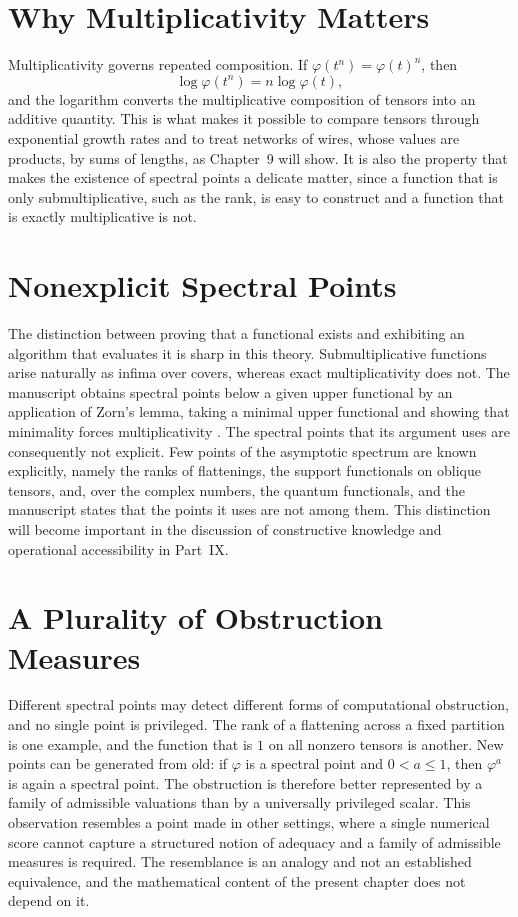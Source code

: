\documentclass[11pt,letterpaper]{report}
\theoremstyle{plain}
\theoremstyle{definition}
\theoremstyle{remark}
\begin{document}
\section{Why Multiplicativity Matters}

Multiplicativity governs repeated composition. If $\varphi(t^{n})=\varphi(t)^n$, then
\[
\log\varphi(t^{n})=n\log\varphi(t),
\]
and the logarithm converts the multiplicative composition of tensors into an additive quantity. This is what makes it possible to compare tensors through exponential growth rates and to treat networks of wires, whose values are products, by sums of lengths, as Chapter~9 will show. It is also the property that makes the existence of spectral points a delicate matter, since a function that is only submultiplicative, such as the rank, is easy to construct and a function that is exactly multiplicative is not.

\section{Nonexplicit Spectral Points}

The distinction between proving that a functional exists and exhibiting an algorithm that evaluates it is sharp in this theory. Submultiplicative functions arise naturally as infima over covers, whereas exact multiplicativity does not. The manuscript obtains spectral points below a given upper functional by an application of Zorn's lemma, taking a minimal upper functional and showing that minimality forces multiplicativity \cite{Source2026}. The spectral points that its argument uses are consequently not explicit. Few points of the asymptotic spectrum are known explicitly, namely the ranks of flattenings, the support functionals on oblique tensors, and, over the complex numbers, the quantum functionals, and the manuscript states that the points it uses are not among them. This distinction will become important in the discussion of constructive knowledge and operational accessibility in Part~IX.

\section{A Plurality of Obstruction Measures}

Different spectral points may detect different forms of computational obstruction, and no single point is privileged. The rank of a flattening across a fixed partition is one example, and the function that is $1$ on all nonzero tensors is another. New points can be generated from old: if $\varphi$ is a spectral point and $0<a\le1$, then $\varphi^a$ is again a spectral point. The obstruction is therefore better represented by a family of admissible valuations than by a universally privileged scalar. This observation resembles a point made in other settings, where a single numerical score cannot capture a structured notion of adequacy and a family of admissible measures is required. The resemblance is an analogy and not an established equivalence, and the mathematical content of the present chapter does not depend on it.
\end{document}
